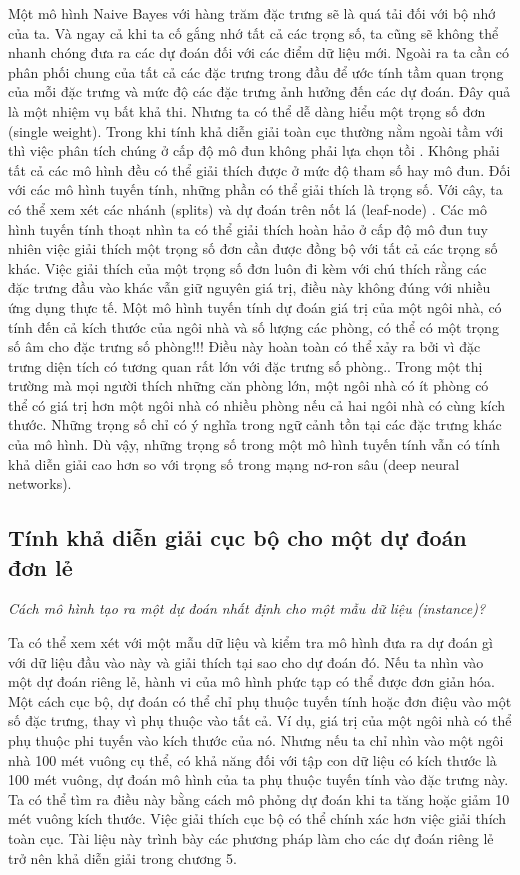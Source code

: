 Một mô hình Naive Bayes với hàng trăm đặc trưng sẽ là quá tải đối với bộ nhớ của ta. Và ngay cả khi ta cố gắng nhớ tất cả các trọng số, ta cũng sẽ không thể nhanh chóng đưa ra các dự đoán đối với các điểm dữ liệu mới. Ngoài ra ta cần có phân phối chung của tất cả các đặc trưng trong đầu để ước tính tầm quan trọng của mỗi đặc trưng và mức độ các đặc trưng ảnh hưởng đến các dự đoán. Đây quả là một nhiệm vụ bất khả thi. Nhưng ta có thể dễ dàng hiểu một trọng số đơn (single weight). Trong khi tính khả diễn giải toàn cục thường nằm ngoài tầm với thì việc phân tích chúng ở cấp độ mô đun không phải lựa chọn tồi . Không phải tất cả các mô hình đều có thể giải thích được ở mức độ tham số hay mô đun. Đối với các mô hình tuyến tính, những phần có thể giải thích là trọng số. Với cây, ta có thể xem xét các nhánh (splits) và dự đoán trên nốt lá (leaf-node) . Các mô hình tuyến tính thoạt nhìn ta có thể giải thích hoàn hảo ở cấp độ mô đun tuy nhiên việc giải thích một trọng số đơn cần được đồng bộ với tất cả các trọng số khác. Việc giải thích của một trọng số đơn luôn đi kèm với chú thích rằng các đặc trưng đầu vào khác vẫn giữ nguyên giá trị, điều này không đúng với nhiều ứng dụng thực tế. Một mô hình tuyến tính dự đoán giá trị của một ngôi nhà, có tính đến cả kích thước của ngôi nhà và số lượng các phòng, có thể có một trọng số âm cho đặc trưng số phòng!!! Điều này hoàn toàn có thể xảy ra bởi vì đặc trưng diện tích có tương quan rất lớn với đặc trưng số phòng.. Trong một thị trường mà mọi người thích những căn phòng lớn, một ngôi nhà có ít phòng có thể có giá trị hơn một ngôi nhà có nhiều phòng nếu cả hai ngôi nhà có cùng kích thước. Những trọng số chỉ có ý nghĩa trong ngữ cảnh tồn tại các đặc trưng khác của mô hình. Dù vậy, những trọng số trong một mô hình tuyến tính vẫn có tính khả diễn giải cao hơn so với trọng số trong mạng nơ-ron sâu (deep neural networks).

\subsection{Tính khả diễn giải cục bộ cho một dự đoán đơn lẻ}
\textit{Cách mô hình tạo ra một dự đoán nhất định cho một mẫu dữ liệu (instance)?}

Ta có thể xem xét với một mẫu dữ liệu và kiểm tra mô hình đưa ra dự đoán gì với dữ liệu đầu vào này và giải thích tại sao cho dự đoán đó. Nếu ta nhìn vào một dự đoán riêng lẻ, hành vi của mô hình phức tạp có thể được đơn giản hóa. Một cách cục bộ, dự đoán có thể chỉ phụ thuộc tuyến tính hoặc đơn điệu vào một số đặc trưng, thay vì phụ thuộc vào tất cả. Ví dụ, giá trị của một ngôi nhà có thể phụ thuộc phi tuyến vào kích thước của nó. Nhưng nếu ta chỉ nhìn vào một ngôi nhà 100 mét vuông cụ thể, có khả năng đối với tập con dữ liệu có kích thước là 100 mét vuông, dự đoán mô hình của ta phụ thuộc tuyến tính vào đặc trưng này. Ta có thể tìm ra điều này bằng cách mô phỏng dự đoán khi ta tăng hoặc giảm 10 mét vuông kích thước. Việc giải thích cục bộ có thể chính xác hơn việc giải thích toàn cục. Tài liệu này trình bày các phương pháp làm cho các dự đoán riêng lẻ trở nên khả diễn giải trong chương 5.

